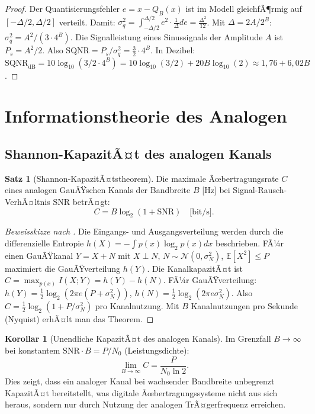 ﻿\documentclass[a4paper,12pt]{article}
\theoremstyle{definition}
\newtheorem{satz}{Satz}
\newtheorem{korollar}{Korollar}
\begin{document}
\begin{proof}
Der Quantisierungsfehler $e = x - Q_B(x)$ ist im Modell gleichfÃ¶rmig auf
$[-\Delta/2, \Delta/2]$ verteilt.  Damit:
$\sigma_q^2 = \int_{-\Delta/2}^{\Delta/2} e^2 \cdot \frac{1}{\Delta} de = \frac{\Delta^2}{12}$.
Mit $\Delta = 2A/2^B$: $\sigma_q^2 = A^2/(3 \cdot 4^B)$.
Die Signalleistung eines Sinussignals der Amplitude $A$ ist $P_s = A^2/2$.
Also $\mathrm{SQNR} = P_s/\sigma_q^2 = \frac{3}{2} \cdot 4^B$.
In Dezibel: $\mathrm{SQNR}_{\mathrm{dB}} = 10\log_{10}(3/2 \cdot 4^B) = 10\log_{10}(3/2) + 20B\log_{10}(2) \approx 1{,}76 + 6{,}02 B$.
\end{proof}

\section{Informationstheorie des Analogen}
\label{sec:information}

\subsection{Shannon-KapazitÃ¤t des analogen Kanals}

\begin{satz}[Shannon-KapazitÃ¤tstheorem]
\label{satz:shannon}
Die maximale Ãœbertragungsrate $C$ eines analogen GauÃŸschen Kanals der Bandbreite
$B$ [Hz] bei Signal-Rausch-VerhÃ¤ltnis $\mathrm{SNR}$ betrÃ¤gt:
\[
C = B \log_2(1 + \mathrm{SNR}) \quad \text{[bit/s]}.
\]
\end{satz}

\begin{proof}[Beweisskizze nach \citealt{Shannon1948}]
Die Eingangs- und Ausgangsverteilung werden durch die differenzielle Entropie
$h(X) = -\int p(x) \log_2 p(x) dx$ beschrieben.
FÃ¼r einen GauÃŸkanal $Y = X + N$ mit $X \perp N$, $N \sim \mathcal{N}(0, \sigma_N^2)$,
$\mathbb{E}[X^2] \leq P$ maximiert die GauÃŸverteilung $h(Y)$.
Die KanalkapazitÃ¤t ist $C = \max_{p(x)} I(X;Y) = h(Y) - h(N)$.
FÃ¼r GauÃŸverteilung: $h(Y) = \frac{1}{2}\log_2(2\pi e (P + \sigma_N^2))$,
$h(N) = \frac{1}{2}\log_2(2\pi e \sigma_N^2)$.
Also $C = \frac{1}{2}\log_2(1 + P/\sigma_N^2)$ pro Kanalnutzung.
Mit $B$ Kanalnutzungen pro Sekunde (Nyquist) erhÃ¤lt man das Theorem.
\end{proof}

\begin{korollar}[Unendliche KapazitÃ¤t des analogen Kanals]
Im Grenzfall $B \to \infty$ bei konstantem $\mathrm{SNR} \cdot B = P/N_0$ (Leistungsdichte):
\[
\lim_{B\to\infty} C = \frac{P}{N_0 \ln 2}.
\]
Dies zeigt, dass ein analoger Kanal bei wachsender Bandbreite unbegrenzt
KapazitÃ¤t bereitstellt, was digitale Ãœbertragungssysteme nicht aus sich heraus,
sondern nur durch Nutzung der analogen TrÃ¤gerfrequenz erreichen.
\end{korollar}
\end{document}
